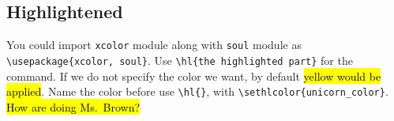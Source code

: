 \documentclass[14pt, letterpaper]{article}
\begin{document}
\subsection{Highlightened}
You could import \texttt{xcolor} module along with \texttt{soul} module as \verb+\usepackage{xcolor, soul}+. 
Use \verb+\hl{the highlighted part}+ for the command. If we do not specify the color we want, by default \hl{yellow would be applied}. Name the color before use \verb+\hl{}+, with \verb+\sethlcolor{unicorn_color}+. 
\hl{How are doing Ms.~Brown?}



\newpage







\clearpage



\end{document}
